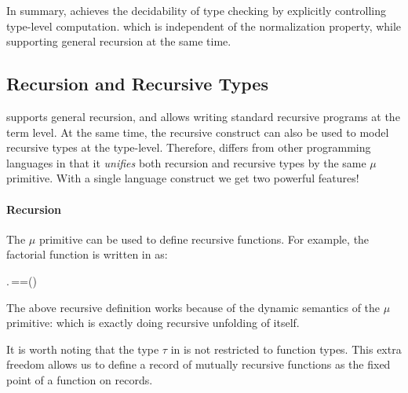 In summary, \name achieves the decidability of type checking by
explicitly controlling type-level computation.  which is independent
of the normalization property, while supporting general recursion at
the same time.

\subsection{Recursion and Recursive Types}

\name supports general recursion, and allows writing standard
recursive programs at the term level. At the same time, the recursive
construct can also be used to model recursive types at the type-level.
Therefore, \name differs from other programming languages in that it
\emph{unifies} both recursion and recursive types by the same $\mu$
primitive. With a single language construct we get two powerful
features!

\paragraph{Recursion}

The $\mu$ primitive can be used to define recursive functions.  For
example, the factorial function is written in \name as:
\begin{hscode}\SaveRestoreHook
{}%
%
%
\>[3]{}\mathrel{=}\mu\;\mathbin{:}\to {}.\,\;==\;\;\;\;\;\times\;\;(\mathbin{-}){}\<[E]%
\ColumnHook
\end{hscode}\resethooks
{}
The above recursive definition works because of the dynamic semantics of the
$\mu$ primitive: \ottusedrule{\ottdruleSXXMu{}} which is exactly doing
recursive unfolding of itself.

It is worth noting that the type $\tau$ in  is not
restricted to function types. This extra freedom allows us to define a
record of mutually recursive functions as the fixed point of a
function on records.


